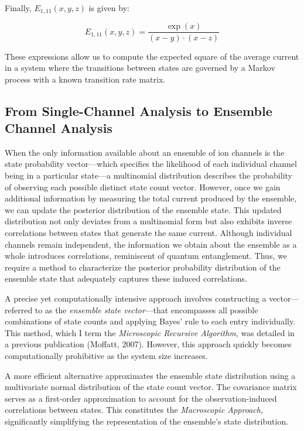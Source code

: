 \documentclass[pdflatex,sn-mathphys-num]{sn-jnl}%
\theoremstyle{thmstyleone}%
\theoremstyle{thmstyletwo}%
\theoremstyle{thmstylethree}%
\begin{document}
Finally, \(E_{1,11}(x, y, z)\) is given by:

\begin{equation}
	E_{1,11}(x, y, z) = \frac{\exp(x)}{(x - y) \cdot (x - z)}
\end{equation}

These expressions allow us to compute the expected square of the average current in a system where the transitions between states are governed by a Markov process with a known transition rate matrix.








\subsection{From Single-Channel Analysis to Ensemble Channel Analysis}

When the only information available about an ensemble of ion channels is the state probability vector—which specifies the likelihood of each individual channel being in a particular state—a multinomial distribution describes the probability of observing each possible distinct state count vector. However, once we gain additional information by measuring the total current produced by the ensemble, we can update the posterior distribution of the ensemble state. This updated distribution not only deviates from a multinomial form but also exhibits inverse correlations between states that generate the same current. Although individual channels remain independent, the information we obtain about the ensemble as a whole introduces correlations, reminiscent of quantum entanglement. Thus, we require a method to characterize the posterior probability distribution of the ensemble state that adequately captures these induced correlations.

A precise yet computationally intensive approach involves constructing a vector—referred to as the \textit{ensemble state vector}—that encompasses all possible combinations of state counts and applying Bayes' rule to each entry individually. This method, which I term the \textit{Microscopic Recursive Algorithm}, was detailed in a previous publication (Moffatt, 2007). However, this approach quickly becomes computationally prohibitive as the system size increases.

A more efficient alternative approximates the ensemble state distribution using a multivariate normal distribution of the state count vector. The covariance matrix serves as a first-order approximation to account for the observation-induced correlations between states. This constitutes the \textit{Macroscopic Approach}, significantly simplifying the representation of the ensemble's state distribution.
\end{document}
